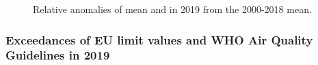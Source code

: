 
\begin{figure}[H]
  \vspace{0.5cm}
\caption{Relative anomalies of mean \PM[10] and \PM[2.5] in 2019 from the 2000-2018 mean.}
\label{fig:PManomin2019}
\end{figure}



\subsubsection[PM exceedances]{Exceedances of EU limit values and WHO Air Quality Guidelines in 2019}
\label{subsec:PMexc}

